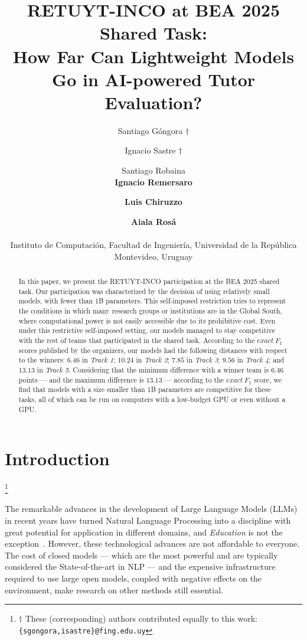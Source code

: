 \documentclass[11pt]{article}
\title{RETUYT-INCO at BEA 2025 Shared Task:\\ How Far Can Lightweight Models Go in AI-powered Tutor Evaluation?}
\author{Santiago Góngora $\dagger$ \and Ignacio Sastre $\dagger$ \and Santiago Robaina \\ {\bf Ignacio Remersaro} \and {\bf Luis Chiruzzo} \and {\bf Aiala Rosá}\\\\
Instituto de Computación, Facultad de Ingeniería, Universidad de la República \\ Montevideo, Uruguay}
\newcommand{\todo}[1]{\textcolor{blue}{\textbf{\small [TODO: #1]}}}
\newcommand\blfootnote[1]{
    \begingroup
    \renewcommand\thefootnote{}\footnote{#1}
    \addtocounter{footnote}{-1}
    \endgroup
}
\begin{document}
\maketitle
\begin{abstract}
In this paper, we present the RETUYT-INCO participation at the BEA 2025 shared task.
Our participation was characterized by the decision of using relatively small models, with fewer than 1B parameters.
This self-imposed restriction tries to represent the conditions in which many research groups or institutions are in the Global South, where computational power is not easily accessible due to its prohibitive cost.
Even under this restrictive self-imposed setting, our models managed to stay competitive with the rest of teams that participated in the shared task.
According to the $exact\ F_1$ scores published by the organizers, our models had the following distances with respect to the winners: $6.46$ in \textit{Track 1}; $10.24$ in \textit{Track 2}; $7.85$ in \textit{Track 3}; $9.56$ in \textit{Track 4}; and $13.13$ in \textit{Track 5}.
Considering that the minimum difference with a winner team is $6.46$ points --- and the maximum difference is $13.13$ --- according to the $exact\ F_1$ score, we find that models with a size smaller than 1B parameters are competitive for these tasks, all of which can be run on computers with a low-budget GPU or even without a GPU.
\end{abstract}

\section{Introduction}
\label{sec:introduction}

\blfootnote{$\dagger$ These (corresponding) authors contributed equally to this work: \texttt{\{sgongora,isastre\}@fing.edu.uy}}



The remarkable advances in the development of Large Language Models (LLMs) in recent years have turned Natural Language Processing into a discipline with great potential for application in different domains, and \textit{Education} is not the exception~\citep{ignat-etal-2024-solved}. 
However, these technological advances are not affordable to everyone. 
The cost of closed models --- which are the most powerful and are typically considered the State-of-the-art in NLP --- and the expensive infrastructure required to use large open models, coupled with negative effects on the environment, make research on other methods still essential.
\end{document}
